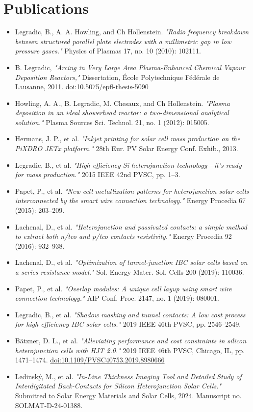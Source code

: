 \documentclass[verylight]{simplehipstercv}
\begin{document}
\section*{Publications}
\begin{itemize}
    \item Legradic, B., A. A. Howling, and Ch Hollenstein. \textit{"Radio frequency breakdown between structured parallel plate electrodes with a millimetric gap in low pressure gases."} Physics of Plasmas 17, no. 10 (2010): 102111.
    \item B. Legradic, \textit{"Arcing in Very Large Area Plasma-Enhanced Chemical Vapour Deposition Reactors,"} Dissertation, École Polytechnique Fédérale de Lausanne, 2011. \href{https://doi.org/10.5075/epfl-thesis-5090}{doi:10.5075/epfl-thesis-5090}
    \item Howling, A. A., B. Legradic, M. Chesaux, and Ch Hollenstein. \textit{"Plasma deposition in an ideal showerhead reactor: a two-dimensional analytical solution."} Plasma Sources Sci. Technol. 21, no. 1 (2012): 015005.
    \item Hermans, J. P., et al. \textit{"Inkjet printing for solar cell mass production on the PiXDRO JETx platform."} 28th Eur. PV Solar Energy Conf. Exhib., 2013.
    \item Legradic, B., et al. \textit{"High efficiency Si-heterojunction technology—it's ready for mass production."} 2015 IEEE 42nd PVSC, pp. 1–3.
    \item Papet, P., et al. \textit{"New cell metallization patterns for heterojunction solar cells interconnected by the smart wire connection technology."} Energy Procedia 67 (2015): 203–209.
    \item Lachenal, D., et al. \textit{"Heterojunction and passivated contacts: a simple method to extract both n/tco and p/tco contacts resistivity."} Energy Procedia 92 (2016): 932–938.
    \item Lachenal, D., et al. \textit{"Optimization of tunnel-junction IBC solar cells based on a series resistance model."} Sol. Energy Mater. Sol. Cells 200 (2019): 110036.
    \item Papet, P., et al. \textit{"Overlap modules: A unique cell layup using smart wire connection technology."} AIP Conf. Proc. 2147, no. 1 (2019): 080001.
    \item Legradic, B., et al. \textit{"Shadow masking and tunnel contacts: A low cost process for high efficiency IBC solar cells."} 2019 IEEE 46th PVSC, pp. 2546–2549.
    \item Bätzner, D. L., et al. \textit{"Alleviating performance and cost constraints in silicon heterojunction cells with HJT 2.0."} 2019 IEEE 46th PVSC, Chicago, IL, pp. 1471–1474. \href{https://doi.org/10.1109/PVSC40753.2019.8980666}{doi:10.1109/PVSC40753.2019.8980666}
    \item Ledinský, M., et al. \textit{"In-Line Thickness Imaging Tool and Detailed Study of Interdigitated Back-Contacts for Silicon Heterojunction Solar Cells."} Submitted to Solar Energy Materials and Solar Cells, 2024. Manuscript no. SOLMAT-D-24-01388.
\end{itemize}
\end{document}
